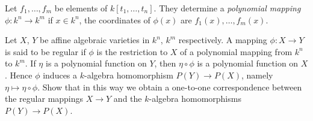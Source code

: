 \documentclass[10pt]{amsart}
\begin{document}
\begin{exercise}
    Let $f_1, \dots, f_m$  be elements of $k[t_1, \dots, t_n]$. They determine a \emph{polynomial mapping} 
    $\phi: k^n \to k^m$ if $x \in k^n$, the coordinates of $\phi(x)$ are $f_1(x), \dots, f_m(x)$.
    
    Let $X$, $Y$ be affine algebraic varieties in $k^n$, $k^m$ respectively. A mapping $\phi: X \to Y$ is said to be regular if $\phi$ is 
    the restriction to $X$ of a polynomial mapping from $k^n$ to $k^m$.
    If $\eta$ is a polynomial function on $Y$, then $\eta \circ \phi$ is a polynomial function on $X$. Hence $\phi$ 
    induces a $k$-algebra homomorphism $P(Y) \to P(X)$, namely $\eta \mapsto \eta \circ \phi$. Show that in this way we obtain a 
    one-to-one correspondence between the regular mappings $X \to Y$ and the $k$-algebra homomorphisms $P(Y) \to P(X)$.
\end{exercise}
\end{document}
